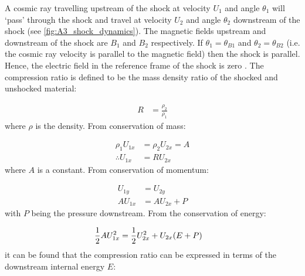 A cosmic ray travelling upstream of the shock at velocity $U_1$ and angle $\theta_1$ will `pass' through the shock and travel at velocity $U_2$ and angle $\theta_2$ downstream of the shock (see \autoref{fig:A3_shock_dynamics}). The magnetic fields upstream and downstream of the shock are $B_1$ and $B_2$ respectively.  If $\theta_1=\theta_{B1}$ and $\theta_2=\theta_{B2}$ (i.e. the cosmic ray velocity is parallel to the magnetic field) then the shock is parallel. Hence, the electric field in the reference frame of the shock is zero \citep{1983RPPh...46..973D}. The compression ratio is defined to be the mass density ratio of the shocked and unshocked material:

\begin{equation}
    \begin{aligned}
        R&=\frac{\rho_2}{\rho_1}
    \end{aligned}
\end{equation}
\noindent where $\rho$ is the density. From conservation of mass:

\begin{equation}
    \begin{aligned}
        \rho_1U_{1x}&=\rho_2U_{2x}=A \\
        \therefore U_{1x}&=RU_{2x}
    \end{aligned} \label{eq:A3_velocity_ratios}
\end{equation}
\noindent where $A$ is a constant. From conservation of momentum:

\begin{subequations}
    \begin{alignat}{1}
        U_{1y}&=U_{2y} \\
        AU_{1x}&=AU_{2x}+P
    \end{alignat}
\end{subequations}
\noindent with $P$ being the pressure downstream. From the conservation of energy:

\begin{equation}
    \begin{aligned}
        \frac{1}{2}AU_{1x}^2&=\frac{1}{2}U_{2x}^2+U_{2x}\qty(E+P)
    \end{aligned}
\end{equation}
\noindent it can be found that the compression ratio can be expressed in terms of the downstream internal energy $E$:

